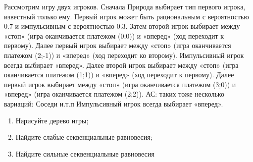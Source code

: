 \begin{problem}

Рассмотрим игру двух игроков. Сначала Природа выбирает тип первого игрока, известный только ему. Первый игрок может быть рациональным с вероятностью 0.7 и импульсивным с вероятностью 0.3. Затем второй игрок выбирает между «стоп» (игра оканчивается  платежом (0;0)) и «вперед» (ход переходит к первому). Далее первый игрок выбирает между «стоп» (игра оканчивается платежом (2;-1)) и «вперед» (ход переходит ко второму). Импульсивный игрок всегда выбирает «вперед». Далее второй игрок выбирает между «стоп» (игра оканчивается платежом (1;1)) и «вперед» (ход переходит к первому). Далее первый игрок выбирает между «стоп» (игра оканчивается платежом (3;0)) и «вперед» (игра оканчивается платежом (2;2)).
{\red АС: таких тоже несколько вариаций: Соседи и.т.п}
Импульсивный игрок всегда выбирает «вперед». \par
\begin{enumerate}
\item Нарисуйте дерево игры; \par
\item Найдите слабые секвенциальные равновесия; \par
\item  Найдите {\red сильные} секвенциальные равновесия \par
\begin{source}
\cite{lones:dtc}
\end{source}
\end{enumerate}


\begin{sol}

\end{sol}
\end{problem}



